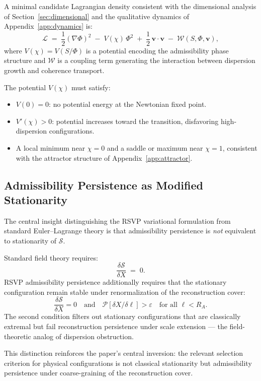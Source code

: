 \documentclass[11pt, a4paper]{article}
\theoremstyle{plain}
\theoremstyle{definition}
\theoremstyle{remark}
\newcommand{\RA}{R_{\!A}}
\begin{document}
A minimal candidate Lagrangian density consistent with the dimensional analysis of
Section~\ref{sec:dimensional} and the qualitative dynamics of
Appendix~\ref{app:dynamics} is:
\begin{equation}
  \label{eq:lagrangian}
  \mathcal{L} \;=\;
    \frac{1}{2}(\nabla\Phi)^2
    \;-\; V(\chi)\,\Phi^2
    \;+\; \frac{1}{2}\,\mathbf{v}\cdot\mathbf{v}
    \;-\; \mathcal{W}(S,\Phi,\mathbf{v}),
\end{equation}
where $V(\chi) = V(S/\Phi)$ is a potential encoding the admissibility phase
structure and $\mathcal{W}$ is a coupling term generating the interaction between
dispersion growth and coherence transport.

The potential $V(\chi)$ must satisfy:
\begin{itemize}
  \item $V(0) = 0$: no potential energy at the Newtonian fixed point.
  \item $V'(\chi) > 0$: potential increases toward the transition, disfavoring
    high-dispersion configurations.
  \item A local minimum near $\chi = 0$ and a saddle or maximum near $\chi = 1$,
    consistent with the attractor structure of Appendix~\ref{app:attractor}.
\end{itemize}

\subsection{Admissibility Persistence as Modified Stationarity}

The central insight distinguishing the RSVP variational formulation from standard
Euler--Lagrange theory is that admissibility persistence is \emph{not} equivalent to
stationarity of $\mathcal{S}$.

Standard field theory requires:
\[
  \frac{\delta \mathcal{S}}{\delta X} \;=\; 0.
\]
RSVP admissibility persistence additionally requires that the stationary
configuration remain stable under renormalization of the reconstruction cover:
\[
  \frac{\delta \mathcal{S}}{\delta X} = 0
  \quad \text{and} \quad
  \mathcal{P}[\delta X / \delta \ell] > \varepsilon
  \quad \text{for all } \ell < \RA.
\]
The second condition filters out stationary configurations that are classically
extremal but fail reconstruction persistence under scale extension --- the
field-theoretic analog of dispersion obstruction.

This distinction reinforces the paper's central inversion: the relevant selection
criterion for physical configurations is not classical stationarity but admissibility
persistence under coarse-graining of the reconstruction cover.
\end{document}
